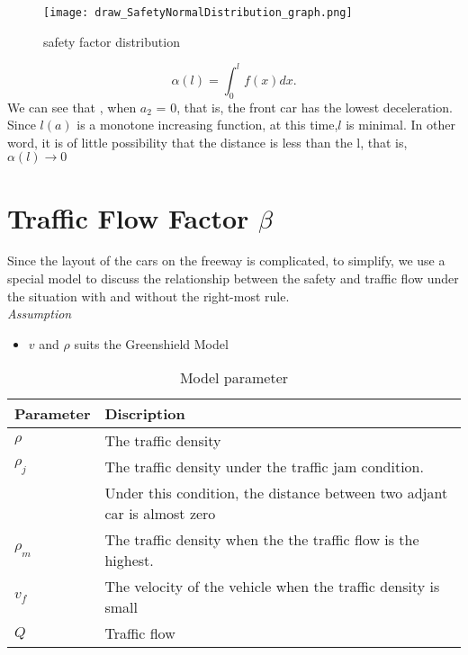 \begin{figure}[h]
\small
\centering
\texttt{[image: draw\_SafetyNormalDistribution\_graph.png]}
\caption{safety factor distribution} \label{fig: safety factor distribution}
\end{figure}
\begin{displaymath}
\alpha(l) = \int_{0}^{l} f(x) dx.
\end{displaymath}
We can see that , when $a_2$ = 0, that is, the front car 
has the lowest deceleration. Since $l(a)$ is a monotone 
increasing function, at this time,$l$ is minimal. In other 
word, it is of little possibility that the distance is less 
than the l, that is, $\alpha(l) \rightarrow 0$                     


\section{Traffic Flow Factor $\beta$}\label{sec: Traffic Flow Factor}
Since the layout of the cars on the freeway is complicated, 
to simplify, we use a special model to discuss the 
relationship between the safety and traffic flow under the 
situation with and without the right-most rule.
\\
\emph{Assumption}
\begin{itemize}
\item $v$ and $\rho$ suits the Greenshield Model
\end{itemize}

\begin{table}
\centering
\begin{tabular}{ll}
\hline
Parameter & Discription\\
\hline
$\rho $ & The traffic density\\
$\rho_j$ & The traffic density under the traffic jam condition. \\
&Under this condition, the distance between two adjant car is almost zero\\
$\rho_m$ & The traffic density when the the traffic flow is the highest.\\
$v_f$ & The velocity of the vehicle when the traffic density is small \\
$Q$ & Traffic flow \\
\hline
\end{tabular}
\caption{Model parameter}
\end{table}


